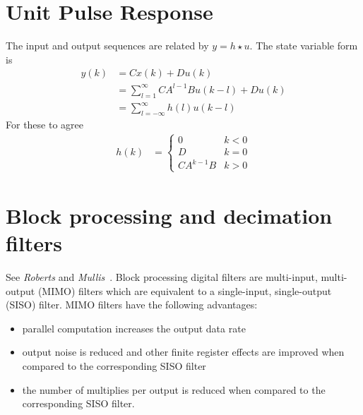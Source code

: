 \documentclass[a4paper,twoside,10pt,english]{report}
\begin{document}
\section{Unit Pulse Response\label{sec:Unit-pulse-response}}
The input and output sequences are related by $y = h\star u$. The state 
variable form is
\begin{align*}
y\left(k\right) &= Cx\left(k\right)+Du\left(k\right)\\
 &= \sum_{l=1}^{\infty}CA^{l-1}Bu\left(k-l\right)+Du\left(k\right)\\
 &= \sum_{l=-\infty}^{\infty}h\left(l\right)u\left(k-l\right)
\end{align*}
For these to agree
\begin{align*}
h\left(k\right) &= \begin{cases}
0 & k<0\\
D & k=0\\
CA^{k-1}B & k>0
\end{cases}
\end{align*}
\section{\label{sec:Block-proc-filters}Block processing and decimation filters}
See \emph{Roberts} and 
\emph{Mullis}~\cite[Section 10.2]{RobertsMullis_DigitalSignalProcessing}.
Block processing digital filters are multi-input, multi-output (MIMO) filters 
which are equivalent to a single-input, single-output (SISO) filter. MIMO 
filters have the following advantages:
\begin{itemize}
\item parallel computation increases the output data rate
\item output noise is reduced and other finite register effects are improved when compared to the corresponding SISO filter
\item the number of multiplies per output is reduced when compared to the
corresponding SISO filter. 
\end{itemize}
\end{document}
